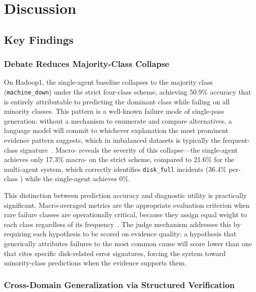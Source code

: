 
\chapter{Discussion}

\section{Key Findings}

\subsection{Debate Reduces Majority-Class Collapse}

On Hadoop1, the single-agent baseline collapses to the majority class (\texttt{machine\_down})
under the strict four-class scheme, achieving 50.9\% accuracy that is entirely attributable to
predicting the dominant class while failing on all minority classes. This pattern is a well-known
failure mode of single-pass generation: without a mechanism to enumerate and compare alternatives,
a language model will commit to whichever explanation the most prominent evidence pattern suggests,
which in imbalanced datasets is typically the frequent-class
signature~\cite{du2023improvingfactualityreasoninglanguage}. Macro-\fone{} reveals the severity of
this collapse---the single-agent achieves only 17.3\% macro-\fone{} on the strict scheme, compared
to 21.6\% for the multi-agent system, which correctly identifies \texttt{disk\_full} incidents
(36.4\% per-class \fone{}) while the single-agent achieves 0\%.

This distinction between prediction accuracy and diagnostic utility is practically significant.
Macro-averaged metrics are the appropriate evaluation criterion when rare failure classes are
operationally critical, because they assign equal weight to each class regardless of its
frequency~\cite{le2022logdlhowfar}. The judge mechanism addresses this by requiring each
hypothesis to be scored on evidence quality; a hypothesis that generically attributes failures to
the most common cause will score lower than one that cites specific disk-related error signatures,
forcing the system toward minority-class predictions when the evidence supports them.

\subsection{Cross-Domain Generalization via Structured Verification}

